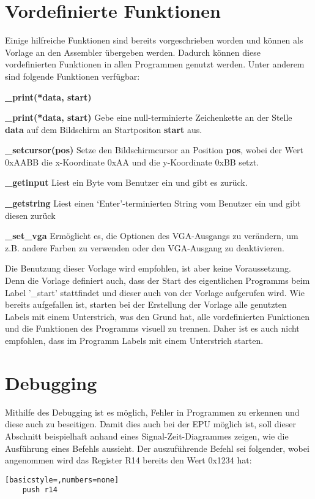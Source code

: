 \clearpage
\section{Vordefinierte Funktionen}
Einige hilfreiche Funktionen sind bereits vorgeschrieben worden und
können als Vorlage an den Assembler übergeben werden. Dadurch können diese
vordefinierten Funktionen in allen Programmen genutzt werden. Unter anderem sind
folgende Funktionen verfügbar:
\begin{labeling}{\textbf{\_print(*data, start)}}
\item [\textbf{\_print(*data, start)}] Gebe eine null-terminierte Zeichenkette an der
Stelle \textbf{data} auf dem Bildschirm an Startpositon \textbf{start}
aus.
\item [\textbf{\_setcursor(pos)}] Setze den Bildschirmcursor an Position \textbf{pos},
	wobei der Wert 0xAABB die x-Koordinate 0xAA und die y-Koordinate 0xBB setzt.
\item [\textbf{\_getinput}] Liest ein Byte vom Benutzer ein und gibt es zurück.
\item [\textbf{\_getstring}] Liest einen `Enter'-terminierten String vom Benutzer ein und
	gibt diesen zurück
\item [\textbf{\_set\_vga}] Ermöglicht es, die Optionen des VGA-Ausgangs zu verändern, um
	z.B. andere Farben zu verwenden oder den VGA-Ausgang zu deaktivieren.
\end{labeling}
Die Benutzung dieser Vorlage wird empfohlen, ist aber keine Voraussetzung. Denn
die Vorlage definiert auch, dass der Start des eigentlichen Programms beim Label
'\_start' stattfindet und dieser auch von der Vorlage aufgerufen wird. Wie
bereits aufgefallen ist, starten bei der Erstellung der Vorlage
alle genutzten Labels mit einem Unterstrich, was den Grund hat, alle
vordefinierten Funktionen und die Funktionen des Programms visuell zu trennen.
Daher ist es auch nicht empfohlen, dass im Programm Labels mit einem Unterstrich
starten.
\pagebreak
\section{Debugging}
Mithilfe des Debugging ist es möglich, Fehler in Programmen zu erkennen und
diese auch zu beseitigen. Damit dies auch bei der \ac{EPU} möglich ist, soll
dieser Abschnitt beispielhaft anhand eines Signal-Zeit-Diagrammes zeigen, wie die
Ausführung eines Befehls aussieht.
Der auszuführende Befehl sei folgender, wobei angenommen wird das Register R14
bereits den Wert 0x1234 hat:
\begin{lstlisting}[basicstyle=,numbers=none]
	push r14
\end{lstlisting}

